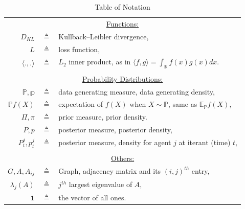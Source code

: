 \documentclass[twoside,11pt]{article}
\numberwithin{equation}{section}
\newcommand{\R}{{\mathbb{R}}}
\newcommand{\E}{\mathbb{E}}
\newcommand\bP{\mathbb{P}}
\newcommand\bp{\mathbb{p}}
\newcommand{\ones}{\mathbf{1}}
\begin{document}
\begin{table}[htbp]\caption{Table of Notation}
\begin{center}%
\begin{tabular}{r c p{10cm} }
\toprule
\multicolumn{3}{c}{\underline{Functions:}}\\
$D_{KL}$ & $\triangleq$ & Kullback–Leibler divergence,  \\
$L$ & $\triangleq$ &loss function,  \\
$\langle.,.\rangle$ & $\triangleq$ & $L_2$ inner product, as in $\langle f,g \rangle = \int_\R f(x)g(x) dx$. \\
\\
\multicolumn{3}{c}{\underline{Probability Distributions:}}\\
$\bP, \bp$ & $\triangleq$ & data generating measure, data generating density, \\
$\bP f(X)$ & $\triangleq$ &expectation of $f(X)$ when $X \sim \bP$, same as $\E_\bP f(X)$, \\
$\Pi, \pi$ & $\triangleq$ &prior measure, prior density. \\
$P, p$ & $\triangleq$ &posterior measure, posterior density, \\
$P_t^j, p_t^j$ & $\triangleq$ & posterior measure, density for agent $j$ at iterant (time) $t$, \\
\\
\multicolumn{3}{c}{\underline{Others:}}\\
$G,A, A_{ij}$ & $\triangleq$ & Graph, adjacency matrix and its $(i,j)^{th}$ entry, \\
$\lambda_j(A)$ & $\triangleq$ & $j^{th}$ largest eigenvalue of $A$, \\
$\ones$ & $\triangleq$ & the vector of all ones. \\

\bottomrule
\end{tabular}
\end{center}
\label{tab:TableOfNotationForMyResearch}
\end{table}
\end{document}
